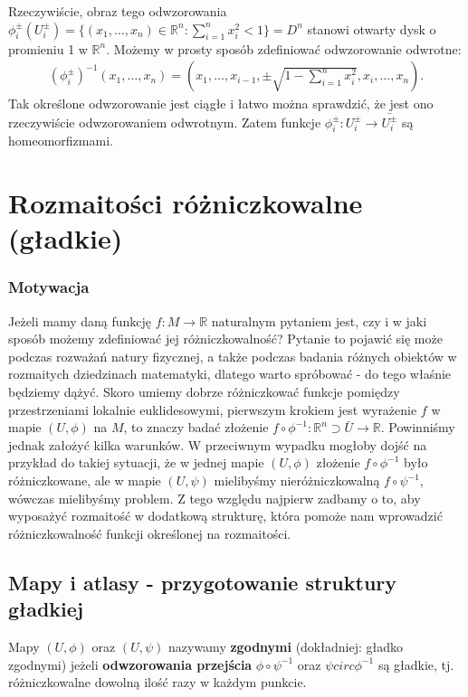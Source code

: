 Rzeczywiście, obraz tego odwzorowania $\phi_i^{\pm}(U_i^{\pm}) = \{(x_1, \dots, x_n) \in \mathbb{R}^n : \sum_{i=1}^{n} x_i^2 < 1\} = D^n$ stanowi otwarty dysk o promieniu 1 w $\mathbb{R}^n$. Możemy w prosty sposób zdefiniować odwzorowanie odwrotne:
\begin{align*}
	\left(\phi_i^{\pm}\right)^{-1}(x_1, \dots, x_n) = \left(x_1, \dots, x_{i-1}, \pm \sqrt{1-\sum_{i=1}^{n} x_i^2}, x_{i}, \dots, x_n\right).
\end{align*}
Tak określone odwzorowanie jest ciągłe i łatwo można sprawdzić, że jest ono rzeczywiście odwzorowaniem odwrotnym. Zatem funkcje $\phi_{i}^{\pm} : U_{i}^{\pm} \to \bar{U_{i}^{\pm}}$ są homeomorfizmami.

\section{Rozmaitości różniczkowalne (gładkie)}
\subsubsection{Motywacja}
Jeżeli mamy daną funkcję $f : M \to \mathbb{R}$ naturalnym pytaniem jest, czy i w jaki sposób możemy zdefiniować jej różniczkowalność? Pytanie to pojawić się może podczas rozważań natury fizycznej, a także podczas badania różnych obiektów w rozmaitych dziedzinach matematyki, dlatego warto spróbować - do tego właśnie będziemy dążyć. Skoro umiemy dobrze różniczkować funkcje pomiędzy przestrzeniami lokalnie euklidesowymi, pierwszym krokiem jest wyrażenie $f$ w mapie $(U,\phi)$ na $M$, to znaczy badać złożenie $f\circ \phi^{-1} : \mathbb{R}^n \supset \bar{U} \to \mathbb{R}$. Powinniśmy jednak założyć kilka warunków. W przeciwnym wypadku mogłoby dojść na przykład do takiej sytuacji, że w jednej mapie $(U,\phi)$ złożenie $f \circ \phi^{-1}$ było różniczkowane, ale w mapie $(U,\psi)$ mielibyśmy nieróżniczkowalną $f \circ \psi^{-1}$, wówczas mielibyśmy problem. Z tego względu najpierw zadbamy o to, aby wyposażyć rozmaitość w dodatkową strukturę, która pomoże nam wprowadzić różniczkowalność funkcji określonej na rozmaitości.

\subsection{Mapy i atlasy - przygotowanie struktury gładkiej}
\begin{definition}
	Mapy $(U,\phi)$ oraz $(U,\psi)$ nazywamy \textbf{zgodnymi} (dokładniej: gładko zgodnymi) jeżeli \textbf{odwzorowania przejścia} $\phi \circ \psi^{-1}$ oraz $\psi circ \phi^{-1}$ są gładkie, tj. różniczkowalne dowolną ilość razy w każdym punkcie.
\end{definition}

